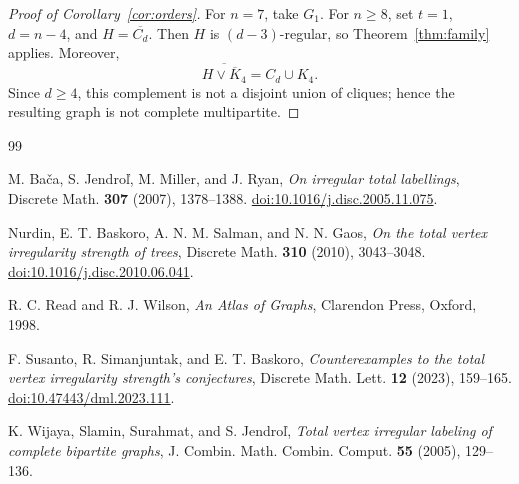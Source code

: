 \documentclass[11pt]{amsart}
\begin{document}
\begin{proof}[Proof of Corollary~\ref{cor:orders}]
For $n=7$, take $G_1$. For $n\ge8$, set $t=1$, $d=n-4$, and
$H=\overline{C_d}$. Then $H$ is $(d-3)$-regular, so
Theorem~\ref{thm:family} applies. Moreover,
\[
  \overline{H\vee\overline{K}_4}=C_d\cup K_4.
\]
Since $d\ge4$, this complement is not a disjoint union of cliques; hence
the resulting graph is not complete multipartite.
\end{proof}

\begin{thebibliography}{99}

M. Ba\v{c}a, S. Jendro\v{l}, M. Miller, and J. Ryan,
\emph{On irregular total labellings},
Discrete Math. \textbf{307} (2007), 1378--1388.
\href{https://doi.org/10.1016/j.disc.2005.11.075}
{doi:10.1016/j.disc.2005.11.075}.

Nurdin, E. T. Baskoro, A. N. M. Salman, and N. N. Gaos,
\emph{On the total vertex irregularity strength of trees},
Discrete Math. \textbf{310} (2010), 3043--3048.
\href{https://doi.org/10.1016/j.disc.2010.06.041}
{doi:10.1016/j.disc.2010.06.041}.

R. C. Read and R. J. Wilson,
\emph{An Atlas of Graphs},
Clarendon Press, Oxford, 1998.

F. Susanto, R. Simanjuntak, and E. T. Baskoro,
\emph{Counterexamples to the total vertex irregularity strength's
conjectures},
Discrete Math. Lett. \textbf{12} (2023), 159--165.
\href{https://doi.org/10.47443/dml.2023.111}
{doi:10.47443/dml.2023.111}.

K. Wijaya, Slamin, Surahmat, and S. Jendro\v{l},
\emph{Total vertex irregular labeling of complete bipartite graphs},
J. Combin. Math. Combin. Comput. \textbf{55} (2005), 129--136.

\end{thebibliography}
\end{document}
